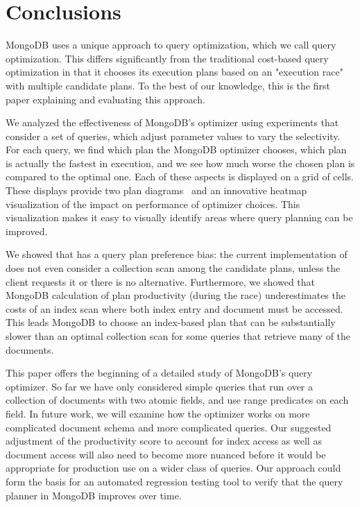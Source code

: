 \section{Conclusions}
\label{sec:conclusions}

MongoDB uses a unique approach to query optimization, which we call \approachName query optimization. This differs significantly from the traditional cost-based query optimization in that it chooses its execution plans based on an "execution race" with multiple candidate plans. To the best of our knowledge, this is the first paper explaining and evaluating this approach.

We analyzed the effectiveness of MongoDB's \approachName optimizer using experiments that consider a set of queries, which adjust parameter values to vary the selectivity. For each query, we find which plan the MongoDB optimizer chooses, which plan is actually the fastest in execution, and we see how much worse the chosen plan is compared to the optimal one. Each of these aspects is displayed on a grid of cells. These displays provide two plan diagrams~\cite{reddy2005analyzing} and an innovative heatmap visualization of the impact on performance of optimizer choices.  This visualization makes it easy to visually identify areas where query planning can be improved.

We showed that \relname has a query plan preference bias: the current implementation of \approachName does not even consider a collection scan among the candidate plans, unless the client requests it or there is no alternative. Furthermore, we showed that MongoDB calculation of plan productivity (during the race) underestimates the costs of an index scan where both index entry and document must be accessed. This leads MongoDB to choose an index-based plan that can be substantially slower than an optimal collection scan for some queries that retrieve many of the documents. 

This paper offers the beginning of a detailed study of MongoDB's query optimizer. So far we have only considered simple queries that run over a collection of documents with two atomic fields, and use range predicates on each field. In future work, we will examine how the optimizer works on more complicated document schema and more complicated queries. Our suggested adjustment of the productivity score to account for index access as well as document access will also need to become more nuanced before it would be appropriate for production use on a wider class of queries. Our approach could form the basis for an automated regression testing tool to verify that the query planner in MongoDB improves over time.


